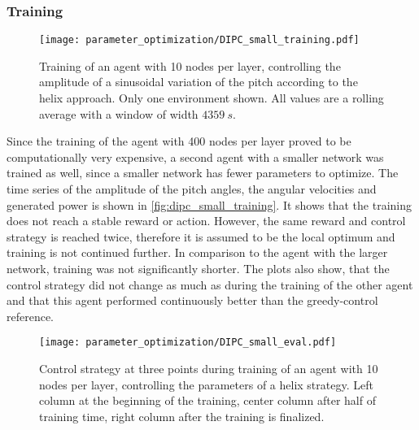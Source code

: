 \subsubsection{Training}
\begin{figure}[h]
	\centering
	\texttt{[image: parameter\_optimization/DIPC\_small\_training.pdf]}
	\caption{Training of an agent with 10 nodes per layer, controlling the amplitude of a sinusoidal variation of the pitch according to the helix approach. Only one environment shown. All values are a rolling average with a window of width $\SI{4359}{s}$.}
	\label{fig:dipc_small_training}
\end{figure}
Since the training of the agent with 400 nodes per layer proved to be computationally very expensive, a second agent with a smaller network was trained as well, since a smaller network has fewer parameters to optimize. The time series of the amplitude of the pitch angles, the angular velocities and generated power is shown in \autoref{fig:dipc_small_training}. It shows that the training does not reach a stable reward or action. However, the same reward and control strategy is reached twice, therefore it is assumed to be the local optimum and training is not continued further. In comparison to the agent with the larger network, training was not significantly shorter. The plots also show, that the control strategy did not change as much as during the training of the other agent and that this agent performed continuously better than the greedy-control reference.
\begin{figure}[h]
\centering
\texttt{[image: parameter\_optimization/DIPC\_small\_eval.pdf]}
\caption{Control strategy at three points during training of an agent with 10 nodes per layer, controlling the parameters of a helix strategy. Left column at the beginning of the training, center column after half of training time, right column after the training is finalized.}
\label{fig:dipc_small_strategies}
\end{figure} \\
